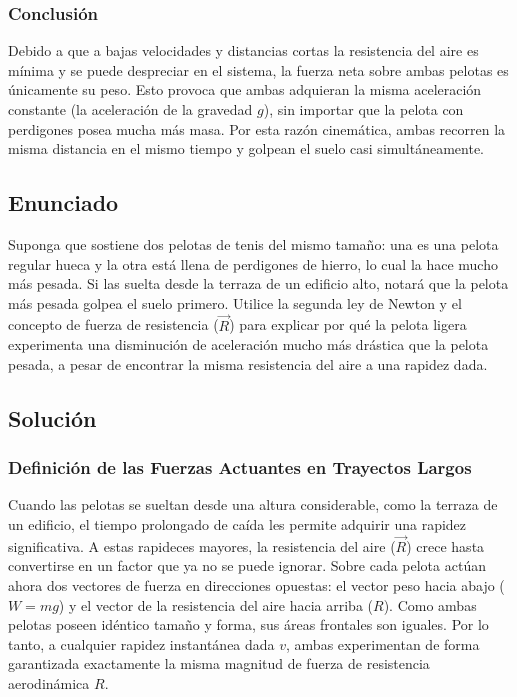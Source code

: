 \documentclass[12pt]{article}
\begin{document}
\subsubsection*{Conclusión}
Debido a que a bajas velocidades y distancias cortas la resistencia del aire es mínima y se puede despreciar en el sistema, la fuerza neta sobre ambas pelotas es únicamente su peso. Esto provoca que ambas adquieran la misma aceleración constante (la aceleración de la gravedad $g$), sin importar que la pelota con perdigones posea mucha más masa. Por esta razón cinemática, ambas recorren la misma distancia en el mismo tiempo y golpean el suelo casi simultáneamente.

\newpage

\subsection*{Enunciado}
Suponga que sostiene dos pelotas de tenis del mismo tamaño: una es una pelota regular hueca y la otra está llena de perdigones de hierro, lo cual la hace mucho más pesada. Si las suelta desde la terraza de un edificio alto, notará que la pelota más pesada golpea el suelo primero. Utilice la segunda ley de Newton y el concepto de fuerza de resistencia ($\vec{R}$) para explicar por qué la pelota ligera experimenta una disminución de aceleración mucho más drástica que la pelota pesada, a pesar de encontrar la misma resistencia del aire a una rapidez dada.

\subsection*{Solución}

\subsubsection*{Definición de las Fuerzas Actuantes en Trayectos Largos}
Cuando las pelotas se sueltan desde una altura considerable, como la terraza de un edificio, el tiempo prolongado de caída les permite adquirir una rapidez significativa. A estas rapideces mayores, la resistencia del aire ($\vec{R}$) crece hasta convertirse en un factor que ya no se puede ignorar. Sobre cada pelota actúan ahora dos vectores de fuerza en direcciones opuestas: el vector peso hacia abajo ($W = mg$) y el vector de la resistencia del aire hacia arriba ($R$). Como ambas pelotas poseen idéntico tamaño y forma, sus áreas frontales son iguales. Por lo tanto, a cualquier rapidez instantánea dada $v$, ambas experimentan de forma garantizada exactamente la misma magnitud de fuerza de resistencia aerodinámica $R$.
\end{document}
